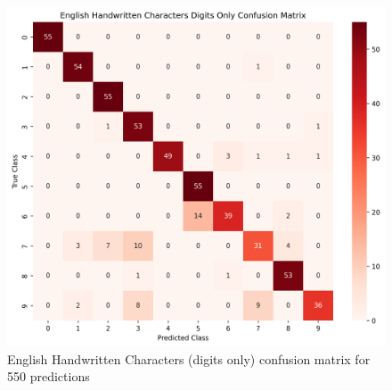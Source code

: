 \begin{figure}[ht]
    \centering
    \includegraphics[width=0.99\columnwidth]{Figures/Results/HandwrittenCharacters/english_handwritten_characters_digits_only_confusion_matrix.png}
    \caption{English Handwritten Characters (digits only) confusion matrix for 550 predictions}
\label{fig:english_handwritten_characters_digits_only_confusion_matrix}
\end{figure}


